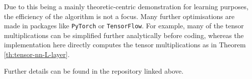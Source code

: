 \documentclass[a4paper]{article}
\theoremstyle{plain} %
\theoremstyle{definition} %
\numberwithin{equation}{subsection}
\begin{document}
Due to this being a mainly theoretic-centric demonstration for learning purposes, the efficiency of the algorithm is not a focus. Many further optimisations are made in packages like \verb|PyTorch| or \verb|TensorFlow|.
For example, many of the tensor multiplications can be simplified further analytically before coding, whereas the implementation here directly computes the tensor multiplications as in Theorem \ref{th:tensor-nn-L-layer}.

Further details can be found in the repository linked above.
\end{document}

